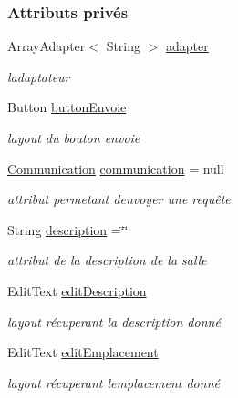 \subsubsection*{Attributs privés}
\begin{DoxyCompactItemize}
\item 
Array\+Adapter$<$ String $>$ \hyperlink{classcom_1_1lasalle_1_1meeting_1_1_configuration_salle_activity_a168dba575f6638ba8c9081dad1b55a6e}{adapter}
\begin{DoxyCompactList}\small\item\em l\textquotesingle{}adaptateur \end{DoxyCompactList}\item 
Button \hyperlink{classcom_1_1lasalle_1_1meeting_1_1_configuration_salle_activity_a1222b15c71483d1b48ed0eb78724db91}{button\+Envoie}
\begin{DoxyCompactList}\small\item\em layout du bouton envoie \end{DoxyCompactList}\item 
\hyperlink{classcom_1_1lasalle_1_1meeting_1_1_communication}{Communication} \hyperlink{classcom_1_1lasalle_1_1meeting_1_1_configuration_salle_activity_a8ad9ee754954c8bc7d9c3f8313e48a2c}{communication} = null
\begin{DoxyCompactList}\small\item\em attribut permetant d\textquotesingle{}envoyer une requête \end{DoxyCompactList}\item 
String \hyperlink{classcom_1_1lasalle_1_1meeting_1_1_configuration_salle_activity_a2cdfb9a7b34f5d63e346a535411337cc}{description} =\char`\"{}\char`\"{}
\begin{DoxyCompactList}\small\item\em attribut de la description de la salle \end{DoxyCompactList}\item 
Edit\+Text \hyperlink{classcom_1_1lasalle_1_1meeting_1_1_configuration_salle_activity_a13e08adff1d4f5317a239a0eb9013bd6}{edit\+Description}
\begin{DoxyCompactList}\small\item\em layout récuperant la description donné \end{DoxyCompactList}\item 
Edit\+Text \hyperlink{classcom_1_1lasalle_1_1meeting_1_1_configuration_salle_activity_aed6844bdfcc65ccf7b9b9ca1960c6773}{edit\+Emplacement}
\begin{DoxyCompactList}\small\item\em layout récuperant l\textquotesingle{}emplacement donné \end{DoxyCompactList}\item 

\end{DoxyCompactItemize}
